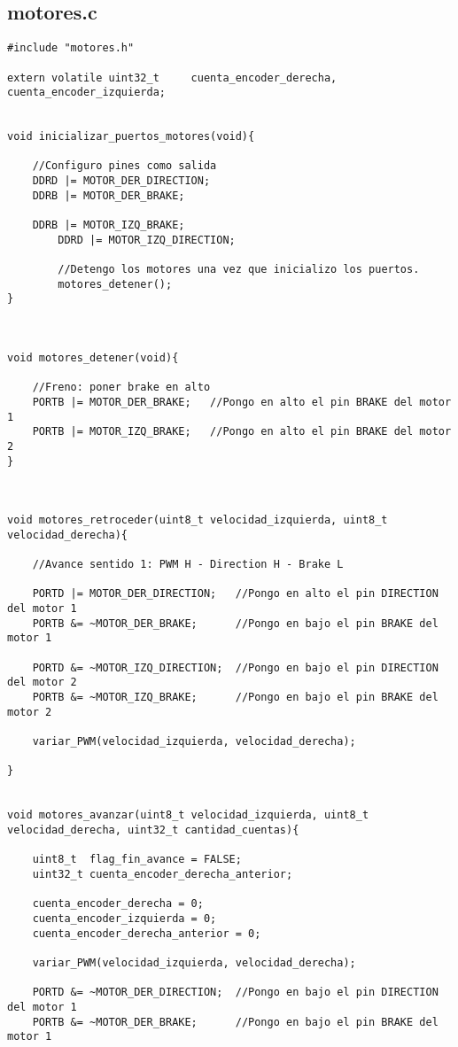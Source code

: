 \documentclass[a4paper,12pt]{article}   %
\begin{document}
\subsection{motores.c}
\begin{lstlisting}
#include "motores.h"

extern volatile uint32_t     cuenta_encoder_derecha, cuenta_encoder_izquierda;


void inicializar_puertos_motores(void){

	//Configuro pines como salida
	DDRD |= MOTOR_DER_DIRECTION;
	DDRB |= MOTOR_DER_BRAKE;

	DDRB |= MOTOR_IZQ_BRAKE;
    	DDRD |= MOTOR_IZQ_DIRECTION;

    	//Detengo los motores una vez que inicializo los puertos.
    	motores_detener();
}



void motores_detener(void){

	//Freno: poner brake en alto
	PORTB |= MOTOR_DER_BRAKE;	//Pongo en alto el pin BRAKE del motor 1
	PORTB |= MOTOR_IZQ_BRAKE;	//Pongo en alto el pin BRAKE del motor 2
}



void motores_retroceder(uint8_t velocidad_izquierda, uint8_t velocidad_derecha){

	//Avance sentido 1: PWM H - Direction H - Brake L

	PORTD |= MOTOR_DER_DIRECTION; 	//Pongo en alto el pin DIRECTION del motor 1
	PORTB &= ~MOTOR_DER_BRAKE;	    //Pongo en bajo el pin BRAKE del motor 1

	PORTD &= ~MOTOR_IZQ_DIRECTION; 	//Pongo en bajo el pin DIRECTION del motor 2
	PORTB &= ~MOTOR_IZQ_BRAKE;	    //Pongo en bajo el pin BRAKE del motor 2

    variar_PWM(velocidad_izquierda, velocidad_derecha);

}


void motores_avanzar(uint8_t velocidad_izquierda, uint8_t velocidad_derecha, uint32_t cantidad_cuentas){

	uint8_t  flag_fin_avance = FALSE;
    uint32_t cuenta_encoder_derecha_anterior;

    cuenta_encoder_derecha = 0;
    cuenta_encoder_izquierda = 0;
    cuenta_encoder_derecha_anterior = 0;

    variar_PWM(velocidad_izquierda, velocidad_derecha);

    PORTD &= ~MOTOR_DER_DIRECTION; 	//Pongo en bajo el pin DIRECTION del motor 1
	PORTB &= ~MOTOR_DER_BRAKE;	    //Pongo en bajo el pin BRAKE del motor 1


\end{lstlisting}
\end{document}
